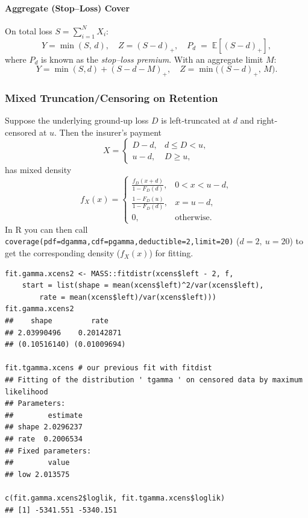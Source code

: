\documentclass[11pt]{article}
\begin{document}
\paragraph{Aggregate (Stop–Loss) Cover}  
On total loss \(S=\sum_{i=1}^N X_i\):
\[
  Y = \min(S,\,d),
  \quad
  Z = (S - d)_{+},
  \quad
  P_d \;=\;\mathbb{E}[(S-d)_{+}],
\]
where \(P_d\) is known as the \emph{stop–loss premium}.  With an aggregate limit \(M\):
\[
  Y = \min(S,d) + (S - d - M)_{+},
  \quad
  Z = \min\bigl((S - d)_{+},\,M\bigr).
\]

\subsubsection{Mixed Truncation/Censoring on Retention}

Suppose the underlying ground‐up loss \(D\) is left‐truncated at \(d\) and right‐censored at \(u\).  Then the insurer’s payment
\[
  X = 
  \begin{cases}
    D - d, & d \le D < u,\\
    u - d, & D \ge u,
  \end{cases}
\]
has mixed density
\[
  f_X(x)
   =
  \begin{cases}
    \displaystyle
    \frac{f_D(x+d)}{1 - F_D(d)}, 
    & 0 < x < u - d,\\[6pt]
    \displaystyle
    \frac{1 - F_D(u)}{1 - F_D(d)},
    & x = u - d,\\
    0,&\text{otherwise.}
  \end{cases}
\]
In \textsf{R} you can then call  
\verb|coverage(pdf=dgamma,cdf=pgamma,deductible=2,limit=20)|  
 ($d=2, \ u=20$) to get the corresponding density ($f_{X}(x)$) for fitting.

\begin{lstlisting}
fit.gamma.xcens2 <- MASS::fitdistr(xcens$left - 2, f,
    start = list(shape = mean(xcens$left)^2/var(xcens$left),
        rate = mean(xcens$left)/var(xcens$left)))
fit.gamma.xcens2
##    shape         rate
## 2.03990496    0.20142871
## (0.10516140) (0.01009694)

fit.tgamma.xcens # our previous fit with fitdist
## Fitting of the distribution ' tgamma ' on censored data by maximum likelihood
## Parameters:
##        estimate
## shape 2.0296237
## rate  0.2006534
## Fixed parameters:
##        value
## low 2.013575

c(fit.gamma.xcens2$loglik, fit.tgamma.xcens$loglik)
## [1] -5341.551 -5340.151
\end{lstlisting}
\end{document}
